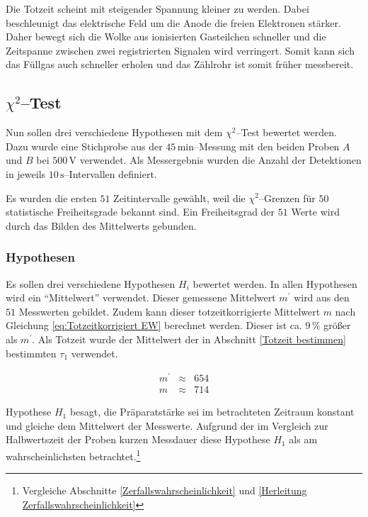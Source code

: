 \documentclass[12pt,a4paper]{scrartcl}
\numberwithin{equation}{section} %
\begin{document}
Die Totzeit scheint mit steigender Spannung kleiner zu werden. Dabei beschleunigt das elektrische Feld um die Anode die freien Elektronen stärker. Daher bewegt sich die Wolke aus ionisierten Gasteilchen schneller und die Zeitspanne zwischen zwei registrierten Signalen wird verringert. Somit kann sich das Füllgas auch schneller erholen und das Zählrohr ist somit früher messbereit.

\hypertarget{chi2test}{\subsection{$\chi^2$--Test}\label{chi2test}}

Nun sollen drei verschiedene Hypothesen mit dem $\chi^2$--Test bewertet werden. Dazu wurde eine Stichprobe aus der $45\mathrm{\,min}$--Messung mit den beiden Proben $A$ und $B$ bei $500\mathrm{\,V}$ verwendet. Als Messergebnis wurden die Anzahl der Detektionen in jeweils $10\mathrm{\,s}$--Intervallen definiert.

Es wurden die ersten $51$ Zeitintervalle gewählt, weil die $\chi^2$--Grenzen für $50$ statistische Freiheitsgrade bekannt sind. \cite{Kapur} Ein Freiheitsgrad der $51$ Werte wird durch das Bilden des Mittelwerts gebunden.

\subsubsection{Hypothesen}
\label{Hypothesen}
Es sollen drei verschiedene Hypothesen $H_i$ bewertet werden. In allen Hypothesen wird ein ``Mittelwert'' verwendet. Dieser gemessene Mittelwert $m^\prime$ wird aus den $51$ Messwerten gebildet. Zudem kann dieser totzeitkorrigierte Mittelwert $m$ nach Gleichung \ref{eq:Totzeitkorrigiert EW} berechnet werden. Dieser ist ca. $9\,\%$ größer als $m^\prime$. Als Totzeit wurde der Mittelwert der in Abschnitt \ref{Totzeit bestimmen} bestimmten $\tau_1$ verwendet.

\begin{eqnarray}
	m^\prime &\approx& 654 \\
	m &\approx& 714
\end{eqnarray}

Hypothese $H_1$ besagt, die Präparatstärke sei im betrachteten Zeitraum konstant und gleiche dem Mittelwert der Messwerte. Aufgrund der im Vergleich zur Halbwertszeit der Proben kurzen Messdauer diese Hypothese $H_1$ als am wahrscheinlichsten betrachtet.\footnote{Vergleiche Abschnitte \ref{Zerfallswahrscheinlichkeit} und \ref{Herleitung Zerfallswahrscheinlichkeit}}
\end{document}
